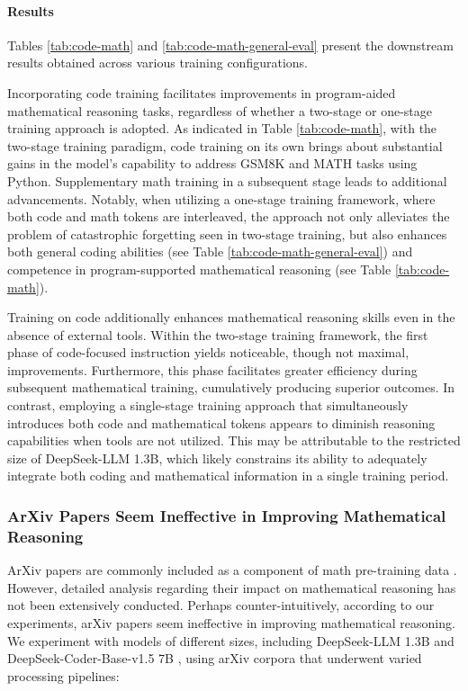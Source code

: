 \begin{itemize}[topsep=0pt]
\begin{itemize}[topsep=0pt]
\paragraph{Results}
Tables \ref{tab:code-math} and \ref{tab:code-math-general-eval} present the downstream results obtained across various training configurations.

Incorporating code training facilitates improvements in program-aided mathematical reasoning tasks, regardless of whether a two-stage or one-stage training approach is adopted. As indicated in Table \ref{tab:code-math}, with the two-stage training paradigm, code training on its own brings about substantial gains in the model’s capability to address GSM8K and MATH tasks using Python. Supplementary math training in a subsequent stage leads to additional advancements. Notably, when utilizing a one-stage training framework, where both code and math tokens are interleaved, the approach not only alleviates the problem of catastrophic forgetting seen in two-stage training, but also enhances both general coding abilities (see Table \ref{tab:code-math-general-eval}) and competence in program-supported mathematical reasoning (see Table \ref{tab:code-math}).

Training on code additionally enhances mathematical reasoning skills even in the absence of external tools. Within the two-stage training framework, the first phase of code-focused instruction yields noticeable, though not maximal, improvements. Furthermore, this phase facilitates greater efficiency during subsequent mathematical training, cumulatively producing superior outcomes. In contrast, employing a single-stage training approach that simultaneously introduces both code and mathematical tokens appears to diminish reasoning capabilities when tools are not utilized. This may be attributable to the restricted size of DeepSeek-LLM 1.3B, which likely constrains its ability to adequately integrate both coding and mathematical information in a single training period.

\subsubsection{ArXiv Papers Seem Ineffective in Improving Mathematical Reasoning}

ArXiv papers are commonly included as a component of math pre-training data \citep{minerva,gpt-f,llemma,mathpile}. However, detailed analysis regarding their impact on mathematical reasoning has not been extensively conducted. Perhaps counter-intuitively, according to our experiments, arXiv papers seem ineffective in improving mathematical reasoning. We experiment with models of different sizes, including DeepSeek-LLM 1.3B and DeepSeek-Coder-Base-v1.5 7B \citep{deepseek-coder}, using arXiv corpora that underwent varied processing pipelines:


\end{itemize}
\end{itemize}
